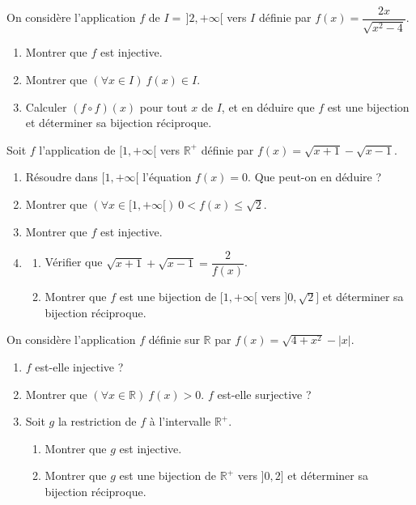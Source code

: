 On considère l'application $f$ de $I=\,]2,+\infty[$ vers $I$ définie par $f(x)=\dfrac{2x}{\sqrt{x^2-4}}$.
\begin{enumerate}
\item Montrer que $f$ est injective.
\item Montrer que $(\forall x\in I)\ f(x)\in I$.
\item Calculer $(f\circ f)(x)$ pour tout $x$ de $I$, et en déduire que $f$ est une bijection et déterminer sa bijection réciproque.
\end{enumerate}
\fin
{}
Soit $f$ l'application de $[1,+\infty[$ vers $\mathbb{R}^+$ définie par $f(x)=\sqrt{x+1}-\sqrt{x-1}$.
\begin{enumerate}
\item Résoudre dans $[1,+\infty[$ l'équation $f(x)=0$. Que peut-on en déduire ?
\item Montrer que $(\forall x\in[1,+\infty[)\ 0<f(x)\leq\sqrt2$.
\item Montrer que $f$ est injective.
\item \begin{enumerate}
\item Vérifier que $\sqrt{x+1}+\sqrt{x-1}=\dfrac{2}{f(x)}$.
\item Montrer que $f$ est une bijection de $[1,+\infty[$ vers $]0,\sqrt2]$ et déterminer sa bijection réciproque.
\end{enumerate}
\end{enumerate}
\fin
{}
On considère l'application $f$ définie sur $\mathbb{R}$ par $f(x)=\sqrt{4+x^2}-|x|$.
\begin{enumerate}
\item $f$ est-elle injective ?
\item Montrer que $(\forall x\in\mathbb{R})\ f(x)>0$. $f$ est-elle surjective ?
\item Soit $g$ la restriction de $f$ à l'intervalle $\mathbb{R}^+$.
\begin{enumerate}
\item Montrer que $g$ est injective.
\item Montrer que $g$ est une bijection de $\mathbb{R}^+$ vers $]0,2]$ et déterminer sa bijection réciproque.
\end{enumerate}
\end{enumerate}
\fin
